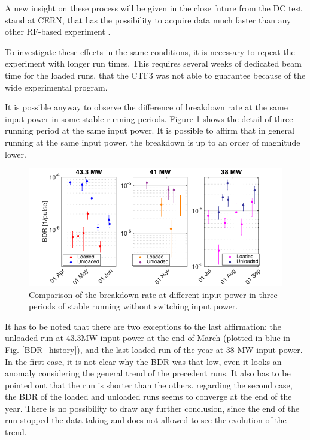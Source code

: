 A new insight on these process will be given in the close future from the DC test stand at CERN, that has the possibility to acquire data much faster than any other RF-based experiment \cite{Walter:PC}.

To investigate these effects in the same conditions, it is necessary to repeat the experiment with longer run times. This requires several weeks of dedicated beam time for the loaded runs, that the CTF3 was not able to guarantee because of the wide experimental program.

It is possible anyway to observe the difference of breakdown rate at the same input power in some stable running periods. Figure \ref{BD_prob} shows the detail of three running period at the same input power. It is possible to affirm that in general running at the same input power, the breakdown is up to an order of magnitude lower. 


\begin{figure}[h]
\centering 
\includegraphics[scale=0.6]{pictures/BDR_zooms.png}
\caption{Comparison of the breakdown rate at different input power in three periods of stable running without switching input power.}
\label{BD_prob}
\end{figure}

It has to be noted that there are two exceptions to the last affirmation: the unloaded run at 43.3MW input power at the end of March (plotted in blue in Fig. \ref{BDR_history}), and the last loaded run of the year at 38 MW input power. In the first case, it is not clear why the BDR was that low, even it looks an anomaly considering the general trend of the precedent runs. It also has to be pointed out that the run is shorter than the others. regarding the second case, the BDR of the loaded and unloaded runs seems to converge at the end of the year. There is no possibility to draw any further conclusion, since the end of the run stopped the data taking and does not allowed to see the evolution of the trend.

